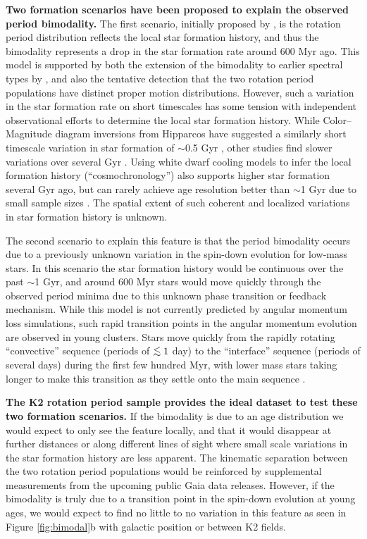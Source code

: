\documentclass[12pt]{article}
\def\lesssim{\mathrel{\hbox{\rlap{\hbox{\lower3pt\hbox{$\sim$}}}\hbox{\raise2pt\hbox{$<$}}}}}
\begin{document}
{\bf Two formation scenarios have been proposed to explain the observed period bimodality.} The first scenario, initially proposed by \citet{mcquillan2013}, is the rotation period distribution reflects the local star formation history, and thus the bimodality represents a drop in the star formation rate around 600 Myr ago. This model is supported by both the extension of the bimodality to earlier spectral types by \citet{davenport2017}, and also the tentative detection that the two rotation period populations have distinct proper motion distributions. However, such a variation in the star formation rate on short timescales has some tension with independent observational efforts to determine the local star formation history. While Color--Magnitude diagram inversions from Hipparcos have suggested a similarly short timescale variation in star formation of  $\sim$0.5 Gyr \citep{hernandez2000}, other studies find slower variations over several Gyr \citep[e.g.][]{cignoni2006}. Using white dwarf cooling models to infer the local formation history (``cosmochronology'') also supports higher star formation several Gyr ago, but can rarely achieve age resolution better than $\sim$1 Gyr due to small sample sizes \citep{tremblay2014}. The spatial extent of such coherent and localized variations in star formation history is unknown.

The second scenario to explain this feature is that the period bimodality occurs due to a previously unknown variation in the spin-down evolution for low-mass stars. In this scenario the star formation history would be continuous over the past $\sim$1 Gyr, and around 600 Myr stars would move quickly through the observed period minima due to this unknown phase transition or feedback mechanism. While this model is not currently predicted by angular momentum loss simulations, such rapid transition points in the angular momentum evolution are observed in young clusters. Stars move quickly from the rapidly rotating ``convective'' sequence (periods of $\lesssim1$ day) to the ``interface'' sequence (periods of several days) during the first few hundred Myr, with lower mass stars taking longer to make this transition as they settle onto the main sequence \citep{barnes2003}. 

{\bf The K2 rotation period sample provides the ideal dataset to test these two formation scenarios.} If the bimodality is due to an age distribution we would expect to only see the feature locally, and that it would disappear at further distances or along different lines of sight where small scale variations in the star formation history are less apparent. The kinematic separation between the two rotation period populations would be reinforced by supplemental measurements from the upcoming public Gaia data releases. However, if the bimodality is truly due to a transition point in the spin-down evolution at young ages, we would expect to find no little to no variation in this feature as seen in Figure \ref{fig:bimodal}b with galactic position or between K2 fields.
\end{document}
